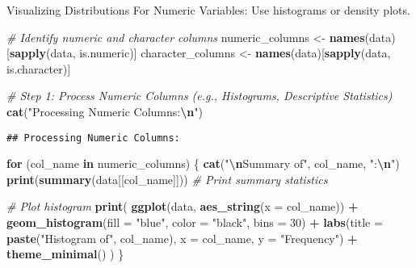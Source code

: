 \documentclass[
]{article}
\newenvironment{Shaded}{\begin{snugshade}}{\end{snugshade}}
\newcommand{\AttributeTok}[1]{\textcolor[rgb]{0.13,0.29,0.53}{#1}}
\newcommand{\CommentTok}[1]{\textcolor[rgb]{0.56,0.35,0.01}{\textit{#1}}}
\newcommand{\ControlFlowTok}[1]{\textcolor[rgb]{0.13,0.29,0.53}{\textbf{#1}}}
\newcommand{\DecValTok}[1]{\textcolor[rgb]{0.00,0.00,0.81}{#1}}
\newcommand{\FunctionTok}[1]{\textcolor[rgb]{0.13,0.29,0.53}{\textbf{#1}}}
\newcommand{\NormalTok}[1]{#1}
\newcommand{\OtherTok}[1]{\textcolor[rgb]{0.56,0.35,0.01}{#1}}
\newcommand{\SpecialCharTok}[1]{\textcolor[rgb]{0.81,0.36,0.00}{\textbf{#1}}}
\newcommand{\StringTok}[1]{\textcolor[rgb]{0.31,0.60,0.02}{#1}}
\begin{document}
Visualizing Distributions For Numeric Variables: Use histograms or
density plots.

\begin{Shaded}
\begin{Highlighting}[]
\CommentTok{\# Identify numeric and character columns}
\NormalTok{numeric\_columns }\OtherTok{\textless{}{-}} \FunctionTok{names}\NormalTok{(data)[}\FunctionTok{sapply}\NormalTok{(data, is.numeric)]}
\NormalTok{character\_columns }\OtherTok{\textless{}{-}} \FunctionTok{names}\NormalTok{(data)[}\FunctionTok{sapply}\NormalTok{(data, is.character)]}

\CommentTok{\# Step 1: Process Numeric Columns (e.g., Histograms, Descriptive Statistics)}
\FunctionTok{cat}\NormalTok{(}\StringTok{"Processing Numeric Columns:}\SpecialCharTok{\textbackslash{}n}\StringTok{"}\NormalTok{)}
\end{Highlighting}
\end{Shaded}

\begin{verbatim}
## Processing Numeric Columns:
\end{verbatim}

\begin{Shaded}
\begin{Highlighting}[]
\ControlFlowTok{for}\NormalTok{ (col\_name }\ControlFlowTok{in}\NormalTok{ numeric\_columns) \{}
  \FunctionTok{cat}\NormalTok{(}\StringTok{"}\SpecialCharTok{\textbackslash{}n}\StringTok{Summary of"}\NormalTok{, col\_name, }\StringTok{":}\SpecialCharTok{\textbackslash{}n}\StringTok{"}\NormalTok{)}
  \FunctionTok{print}\NormalTok{(}\FunctionTok{summary}\NormalTok{(data[[col\_name]]))  }\CommentTok{\# Print summary statistics}
  
  \CommentTok{\# Plot histogram}
  \FunctionTok{print}\NormalTok{(}
    \FunctionTok{ggplot}\NormalTok{(data, }\FunctionTok{aes\_string}\NormalTok{(}\AttributeTok{x =}\NormalTok{ col\_name)) }\SpecialCharTok{+}
      \FunctionTok{geom\_histogram}\NormalTok{(}\AttributeTok{fill =} \StringTok{"blue"}\NormalTok{, }\AttributeTok{color =} \StringTok{"black"}\NormalTok{, }\AttributeTok{bins =} \DecValTok{30}\NormalTok{) }\SpecialCharTok{+}
      \FunctionTok{labs}\NormalTok{(}\AttributeTok{title =} \FunctionTok{paste}\NormalTok{(}\StringTok{"Histogram of"}\NormalTok{, col\_name), }\AttributeTok{x =}\NormalTok{ col\_name, }\AttributeTok{y =} \StringTok{"Frequency"}\NormalTok{) }\SpecialCharTok{+}
      \FunctionTok{theme\_minimal}\NormalTok{()}
\NormalTok{  )}
\NormalTok{\}}
\end{Highlighting}
\end{Shaded}
\end{document}
